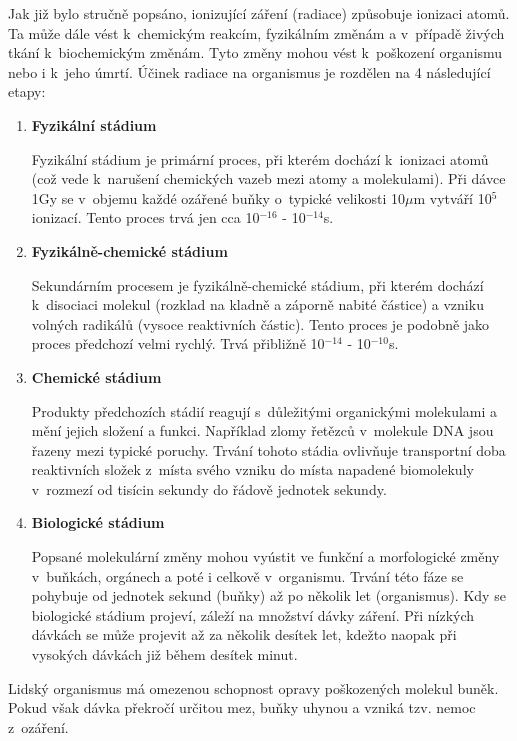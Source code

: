 Jak již bylo stručně popsáno, ionizující záření (radiace) způsobuje
ionizaci atomů. Ta může dále vést k~chemickým reakcím, fyzikálním
změnám a v~případě živých tkání k~biochemickým změnám. Tyto změny
mohou vést k~poškození organismu nebo i k~jeho úmrtí. Účinek radiace
na organismus je rozdělen na 4 následující etapy: \cite{bioZarUllman}

\begin{enumerate}
	\item \textbf{Fyzikální stádium}
	
		Fyzikální stádium je primární proces, při kterém
dochází k~ionizaci atomů (což vede k~narušení chemických vazeb mezi
atomy a molekulami). Při dávce 1Gy se v~objemu každé ozářené buňky
o~typické velikosti 10$\mu$m vytváří 10$^5$ ionizací. Tento proces
trvá jen cca 10$^{-16}$ - 10$^{-14}$s.
		
	\item \textbf{Fyzikálně-chemické stádium}
	
	Sekundárním procesem je fyzikálně-chemické stádium, při kterém
dochází k~disociaci molekul (rozklad na kladně a záporně nabité
částice) a vzniku volných radikálů (vysoce reaktivních částic). Tento
proces je podobně jako proces předchozí velmi rychlý. Trvá přibližně
10$^{-14}$ - 10$^{-10}$s.
	
	\item \textbf{Chemické stádium}
	
	Produkty předchozích stádií reagují s~důležitými organickými
molekulami a mění jejich složení a funkci. Například zlomy řetězců
v~molekule DNA jsou řazeny mezi typické poruchy. Trvání tohoto stádia
ovlivňuje transportní doba reaktivních složek z~místa svého vzniku do
místa napadené biomolekuly v~rozmezí od tisícin sekundy do řádově
jednotek sekundy.
	
	\item \textbf{Biologické stádium}
	
	Popsané molekulární změny mohou vyústit ve funkční a
morfologické změny v~buňkách, orgánech a poté i celkově
v~organismu. Trvání této fáze se pohybuje od jednotek sekund (buňky)
až po několik let (organismus). Kdy se biologické stádium projeví,
záleží na množství dávky záření. Při nízkých dávkách se může projevit
až za několik desítek let, kdežto naopak při vysokých dávkách již
během desítek minut.
\end{enumerate}

Lidský organismus má omezenou schopnost opravy poškozených molekul
buněk. Pokud však dávka překročí určitou mez, buňky uhynou a vzniká
tzv. nemoc z~ozáření.


